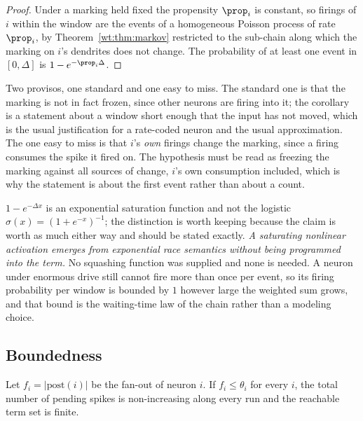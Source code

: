 \begin{proof}
Under a marking held fixed the propensity $\prop_i$ is constant, so firings of $i$ within
the window are the events of a homogeneous Poisson process of rate $\prop_i$, by
Theorem~\ref{wt:thm:markov} restricted to the sub-chain along which the marking on $i$'s
dendrites does not change. The probability of at least one event in $[0,\Delta]$ is
$1 - e^{-\prop_i \Delta}$.
\end{proof}

Two provisos, one standard and one easy to miss. The standard one is that the marking is
not in fact frozen, since other neurons are firing into it; the corollary is a statement
about a window short enough that the input has not moved, which is the usual
justification for a rate-coded neuron and the usual approximation. The one easy to miss
is that $i$'s \emph{own} firings change the marking, since a firing consumes the spike it
fired on. The hypothesis must be read as freezing the marking against all sources of
change, $i$'s own consumption included, which is why the statement is about the first
event rather than about a count.

\begin{remark}
\label{spk:rmk:notlogistic}
$1 - e^{-\Delta x}$ is an exponential saturation function and not the logistic
$\sigma(x) = (1+e^{-x})^{-1}$; the distinction is worth keeping because the claim is
worth as much either way and should be stated exactly. \emph{A saturating nonlinear
activation emerges from exponential race semantics without being programmed into the
term.} No squashing function was supplied and none is needed. A neuron under enormous
drive still cannot fire more than once per event, so its firing probability per window is
bounded by $1$ however large the weighted sum grows, and that bound is the waiting-time
law of the chain rather than a modeling choice.
\end{remark}

\subsection{Boundedness}

\begin{lemma}[Boundedness]
\label{spk:lem:bounded}
Let $f_i = |\mathrm{post}(i)|$ be the fan-out of neuron $i$. If $f_i \leq \theta_i$ for
every $i$, the total number of pending spikes is non-increasing along every run and the
reachable term set is finite.
\end{lemma}

